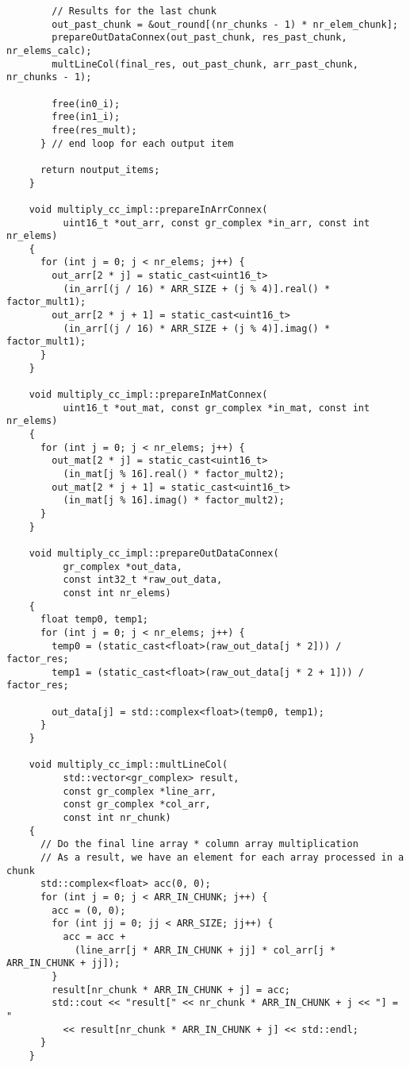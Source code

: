 \begin{lstlisting}
        // Results for the last chunk
        out_past_chunk = &out_round[(nr_chunks - 1) * nr_elem_chunk];
        prepareOutDataConnex(out_past_chunk, res_past_chunk, nr_elems_calc);
        multLineCol(final_res, out_past_chunk, arr_past_chunk, nr_chunks - 1);

        free(in0_i);
        free(in1_i);
        free(res_mult);
      } // end loop for each output item

      return noutput_items;
    }

    void multiply_cc_impl::prepareInArrConnex(
          uint16_t *out_arr, const gr_complex *in_arr, const int nr_elems)
    {
      for (int j = 0; j < nr_elems; j++) {
        out_arr[2 * j] = static_cast<uint16_t>
          (in_arr[(j / 16) * ARR_SIZE + (j % 4)].real() * factor_mult1);
        out_arr[2 * j + 1] = static_cast<uint16_t>
          (in_arr[(j / 16) * ARR_SIZE + (j % 4)].imag() * factor_mult1);
      }
    }

    void multiply_cc_impl::prepareInMatConnex(
          uint16_t *out_mat, const gr_complex *in_mat, const int nr_elems)
    {
      for (int j = 0; j < nr_elems; j++) {
        out_mat[2 * j] = static_cast<uint16_t>
          (in_mat[j % 16].real() * factor_mult2);
        out_mat[2 * j + 1] = static_cast<uint16_t>
          (in_mat[j % 16].imag() * factor_mult2);
      }
    }

    void multiply_cc_impl::prepareOutDataConnex(
          gr_complex *out_data,
          const int32_t *raw_out_data,
          const int nr_elems)
    {
      float temp0, temp1;
      for (int j = 0; j < nr_elems; j++) {
        temp0 = (static_cast<float>(raw_out_data[j * 2])) / factor_res;
        temp1 = (static_cast<float>(raw_out_data[j * 2 + 1])) / factor_res;

        out_data[j] = std::complex<float>(temp0, temp1);
      }
    }

    void multiply_cc_impl::multLineCol(
          std::vector<gr_complex> result,
          const gr_complex *line_arr,
          const gr_complex *col_arr,
          const int nr_chunk)
    {
      // Do the final line array * column array multiplication
      // As a result, we have an element for each array processed in a chunk
      std::complex<float> acc(0, 0);
      for (int j = 0; j < ARR_IN_CHUNK; j++) {
        acc = (0, 0);
        for (int jj = 0; jj < ARR_SIZE; jj++) {
          acc = acc +
            (line_arr[j * ARR_IN_CHUNK + jj] * col_arr[j * ARR_IN_CHUNK + jj]);
        }
        result[nr_chunk * ARR_IN_CHUNK + j] = acc;
        std::cout << "result[" << nr_chunk * ARR_IN_CHUNK + j << "] = "
          << result[nr_chunk * ARR_IN_CHUNK + j] << std::endl;
      }
    }


\end{lstlisting}
